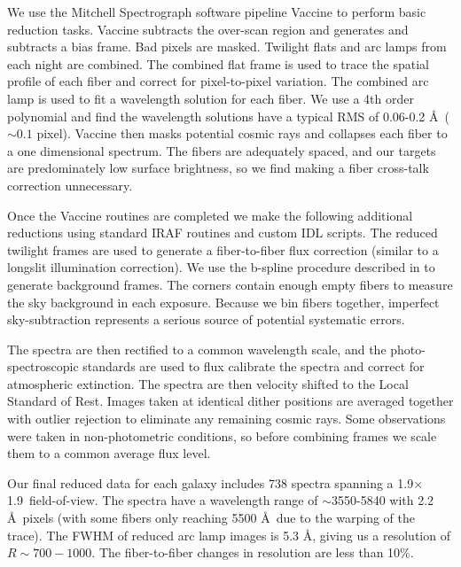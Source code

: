\documentclass[12pt,preprint]{aastex}
\begin{document}

We use the Mitchell Spectrograph software pipeline Vaccine \citep{Adams2011} to perform basic reduction tasks.  Vaccine subtracts the over-scan region and generates and subtracts a bias frame.  Bad pixels are masked.  Twilight flats and arc lamps from each night are combined.  The combined flat frame is used to trace the spatial profile of each fiber and correct for pixel-to-pixel variation.  The combined arc lamp is used to fit a wavelength solution for each fiber.  We use a 4th order polynomial and find the wavelength solutions have a typical RMS of 0.06-0.2 \AA\ ($\sim0.1$ pixel).  Vaccine then masks potential cosmic rays and collapses each fiber to a one dimensional spectrum.  The fibers are adequately spaced, and our targets are predominately low surface brightness, so we find making a fiber cross-talk correction unnecessary.

Once the Vaccine routines are completed we make the following additional reductions using standard IRAF routines and custom IDL scripts.  The reduced twilight frames are used to generate a fiber-to-fiber flux correction (similar to a longslit illumination correction).  We use the b-spline procedure described in \citet{Kelson03} to generate background frames.  The corners contain enough empty fibers to measure the sky background in each exposure.  Because we bin fibers together, imperfect sky-subtraction represents a serious source of potential systematic errors.  

The spectra are then rectified to a common wavelength scale, and the photo-spectroscopic standards are used to flux calibrate the spectra and correct for atmospheric extinction.  The spectra are then velocity shifted to the Local Standard of Rest.  Images taken at identical dither positions are averaged together with outlier rejection to eliminate any remaining cosmic rays.  Some observations were taken in non-photometric conditions, so before combining frames we scale them to a common average flux level.  

Our final reduced data for each galaxy includes 738 spectra spanning a 1.9\arcmin$\times$1.9\arcmin\ field-of-view.  The spectra have a wavelength range of $\sim$3550-5840 with 2.2 \AA\ pixels (with some fibers only reaching 5500 \AA\ due to the warping of the trace).  The FWHM of reduced arc lamp images is 5.3 \AA, giving us a resolution of $R\sim700-1000$.  The fiber-to-fiber changes in resolution are less than 10\%.  
\end{document}
